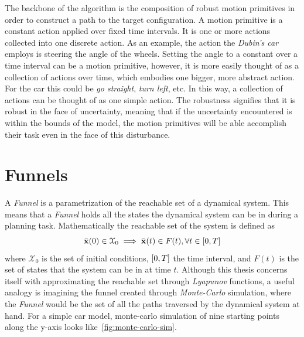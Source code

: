The backbone of the \rrtfunnel{} algorithm is the composition of robust motion
primitives in order to construct a path to the target configuration. A motion
primitive is a constant action applied over fixed time intervals. It is one or
more actions collected into one discrete action. As an example, the action the
\textit{Dubin's car} employs is steering the angle of the wheels. Setting the
angle to a constant over a time interval can be a motion primitive, however, it
is more easily thought of as a collection of actions over time, which embodies
one bigger, more abstract action. For the car this could be \textit{go
  straight}, \textit{turn left}, etc. In this way, a collection of actions can
be thought of as one simple action. The robustness signifies that it is robust
in the face of uncertainty, meaning that if the uncertainty encountered is
within the bounds of the model, the motion primitives will be able accomplish
their task even in the face of this disturbance.

\section{Funnels}

A \textit{Funnel} is a parametrization of the reachable set of a dynamical
system. This means that a \textit{Funnel} holds all the states the dynamical
system can be in during a planning task. Mathematically the reachable set of the
system is defined as
\[
  \bar{\mathbf{x}}(0) \in \mathcal{X}_0 \implies \bar{\mathbf{x}}(t) \in F(t),
  \forall t \in \lbrack0,T\rbrack
\]
where \(\mathcal{X}_0\) is the set of initial conditions, \(\lbrack0,T\rbrack\) the time
interval, and \(F(t)\) is the set of states that the system can be in at time
\(t\). Although this thesis concerns itself with approximating the reachable set
through \textit{Lyapunov} functions, a useful analogy is imagining the funnel
created through \textit{Monte-Carlo} simulation, where the \textit{Funnel} would
be the set of all the paths traversed by the dynamical system at hand. For a
simple car model, monte-carlo simulation of nine starting points along the
y-axis looks like~\cref{fig:monte-carlo-sim}.

